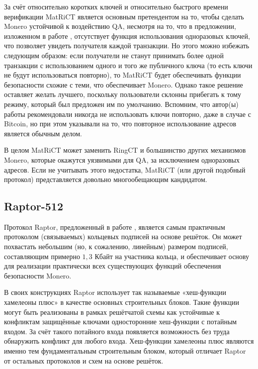 \documentclass{mrl}
\begin{document}
За счёт относительно коротких ключей и относительно быстрого времени верификации MatRiCT является основным претендентом на то, чтобы сделать Monero устойчивой к воздействию QA, несмотря на то, что в предложении, изложенном в работе \cite{esgin2019matrict}, отсутствует функция использования одноразовых ключей, что позволяет увидеть получателя каждой транзакции. Но этого можно избежать следующим образом: если получатели не станут принимать более одной транзакции с использованием одного и того же публичного ключа (то есть ключи не будут использоваться повторно), то MatRiCT будет обеспечивать функции безопасности схожие с теми, что обеспечивает Monero. Однако такое решение оставляет желать лучшего, поскольку пользователи склонны прибегать к тому режиму, который был предложен им по умолчанию. Вспомним, что автор(ы) работы \cite{nakamotobitcoin} рекомендовали никогда не использовать ключи повторно, даже в случае с Bitcoin, но при этом указывали на то, что повторное использование адресов является обычным делом.


В целом MatRiCT может заменить RingCT и большинство других механизмов Monero, которые окажутся уязвимыми для QA, за исключением одноразовых адресов. Если не учитывать этого недостатка, MatRiCT (или другой подобный протокол) представляется довольно многообещающим кандидатом.

\subsection{Raptor-512}

Протокол Raptor, предложенный в работе \cite{lu2019raptor}, является самым практичным протоколом (связываемых) кольцевых подписей на основе решёток. Он может похвастать небольшим (но, к сожалению, линейным) размером подписей, составляющим примерно $1,3$ Кбайт на участника кольца, и обеспечивает основу для реализации практически всех существующих функций обеспечения безопасности Monero.

В своих конструкциях Raptor использует так называемые «хеш-функции хамелеоны плюс» в качестве основных строительных блоков. Такие функции могут быть реализованы в рамках решётчатой схемы как устойчивые к конфликтам защищённые ключами односторонние хеш-функции с потайным входом. За счёт такого потайного входа появляется возможность без труда обнаружить конфликт для любого входа. Хеш-функции хамелеоны плюс являются именно тем фундаментальным строительным блоком, который отличает Raptor от остальных протоколов и схем на основе решёток.
\end{document}
